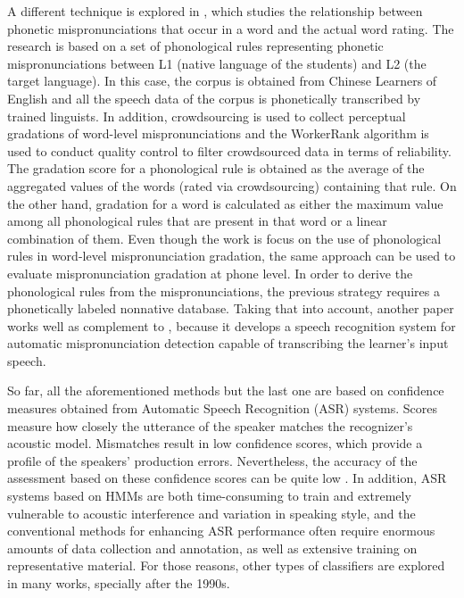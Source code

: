 A different technique is explored in \cite{phonological_rules}, which 
studies the relationship between phonetic mispronunciations that occur in a word
and the actual word rating. The research is based on a set of phonological rules
representing phonetic mispronunciations between L1 (native language of the students)
and L2 (the target language). In this case, the corpus is obtained from Chinese Learners
of English and all the speech data of the corpus is phonetically transcribed by trained linguists.
In addition, crowdsourcing is used to collect perceptual gradations of word-level 
mispronunciations and the WorkerRank algorithm is used to conduct quality control to filter
crowdsourced data in terms of reliability. The gradation score for a phonological rule
is obtained as the average of the aggregated values of the words (rated via crowdsourcing)
containing that rule. On the other hand, gradation for a word is calculated as either
the maximum value among all phonological rules that are present in 
that word or a linear combination
of them. Even though the work is focus on the use of phonological rules in word-level
mispronunciation gradation, the same approach can be used to evaluate mispronunciation
gradation at phone level. In order to derive the phonological rules from the mispronunciations,
the previous strategy requires a phonetically labeled nonnative database. 
Taking that into account, another paper \cite{phonological_rules_2} works well as complement
to \cite{phonological_rules}, because it develops a speech recognition system for automatic
mispronunciation detection capable of transcribing the learner's input speech.

So far, all the aforementioned methods but the last one are based on confidence measures 
obtained from Automatic Speech Recognition (ASR) systems. 
Scores measure how closely the utterance of the speaker matches the recognizer's
acoustic model. Mismatches result in low confidence scores, which provide a profile of the 
speakers' production errors. Nevertheless, the accuracy of the assessment based on these
confidence scores can be quite low \cite{landmark_svm}. 
In addition, ASR systems based on HMMs are both time-consuming to train and extremely vulnerable to
acoustic interference and variation in speaking style, and the conventional methods for
enhancing ASR performance often require enormous amounts of data collection and annotation,
as well as extensive training on representative material.
For those reasons, other types of classifiers are explored in many works, specially after
the 1990s. 

